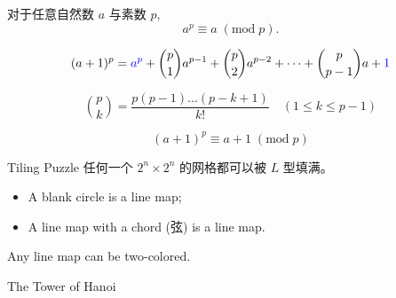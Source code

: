 
\begin{frame}{}
  \begin{theorem}
    对于任意自然数 $a$ 与素数 $p$,
    \[
      a^{p} \equiv a \;(\mathrm{mod}\; p).
    \]
  \end{theorem}

  \pause
  \vspace{0.30cm}
  \[
    (a+1)^p = \textcolor{blue}{a^p} + \binom{p}{1} a^{p-1} + \binom{p}{2} a^{p-2}
      + \dots + \binom{p}{p-1}a + \textcolor{blue}{1}
  \]

  \pause
  \vspace{0.30cm}
  \[
    \binom{p}{k} = \frac{p (p-1) \dots (p-k+1)}{k!} \quad (1 \le k \le p-1)
  \]

  \pause
  \vspace{0.30cm}
  \[
    (a + 1)^{p} \equiv a + 1\; (\mathrm{mod}\; p)
  \]
\end{frame}

\begin{frame}{}
  \begin{exampleblock}{Tiling Puzzle}
    任何一个 $2^{n} \times 2^{n}$ 的网格都可以被 $L$ 型填满。
  \end{exampleblock}

\end{frame}

\begin{frame}{}
  \begin{definition}
    \begin{itemize}
      \item A blank circle is a line map;
      \item A line map with a chord (弦) is a line map.
    \end{itemize}
  \end{definition}


  \pause
  \vspace{-0.50cm}
  \begin{theorem}
    Any line map can be two-colored.
  \end{theorem}
\end{frame}

\begin{frame}{}
  \begin{exampleblock}{The Tower of Hanoi}
  \end{exampleblock}
\end{frame}

